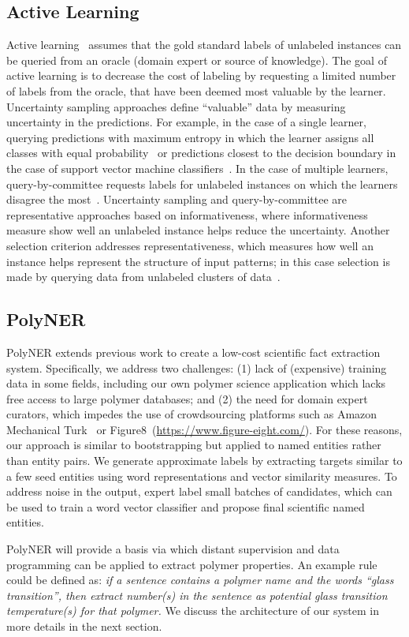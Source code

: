 \subsection{Active Learning}
Active learning~\cite{zhou2017brief} assumes that the gold standard labels of unlabeled instances can be queried from an oracle (domain expert or source of knowledge). 
The goal of active learning is to decrease the cost of labeling by requesting a limited number of labels from the oracle, that have been deemed most valuable by the learner.
Uncertainty sampling approaches define ``valuable'' data by measuring uncertainty in the predictions.
For example, in the case of a single learner, querying predictions with maximum entropy in which the learner assigns all classes with equal probability~\cite{lewis1994heterogeneous} or predictions closest to the decision boundary in the case of support vector machine classifiers~\cite{campbell2000query}.
In the case of multiple learners, query-by-committee requests labels for unlabeled instances on which the learners disagree the most~\cite{seung1992query}.
Uncertainty sampling and query-by-committee are representative approaches based on informativeness, where informativeness measure show well an unlabeled instance helps reduce the uncertainty. 
Another selection criterion addresses representativeness, which measures how well an instance helps represent the structure of input patterns; in this case selection is made by querying data from unlabeled clusters of data~\cite{nguyen2004active,dasgupta2008hierarchical}.

\subsection{PolyNER}
PolyNER extends previous work to create a low-cost scientific fact extraction system. 
Specifically, we address two challenges: (1) lack of (expensive) training data in some fields, including our own polymer science application which lacks free access to large polymer databases; and (2) the need for domain expert curators, which impedes the use of crowdsourcing platforms such as Amazon Mechanical Turk~\cite{buhrmester2011amazon} or Figure8~(\url{https://www.figure-eight.com/}).
For these reasons, our approach is similar to bootstrapping but applied to named entities rather than entity pairs. 
We generate approximate labels by extracting targets similar to a few seed entities using word representations and vector similarity measures.
To address noise in the output, expert label small batches of candidates, which can be used to train a word vector classifier and propose final scientific named entities.

PolyNER will provide a basis via which distant supervision and data programming can be applied to extract polymer properties.
An example rule could be defined as: \textit{if a sentence contains a polymer name and the words ``glass transition'', then extract number(s) in the sentence as potential glass transition temperature(s) for that polymer.}
We discuss the architecture of our system in more details in the next section.